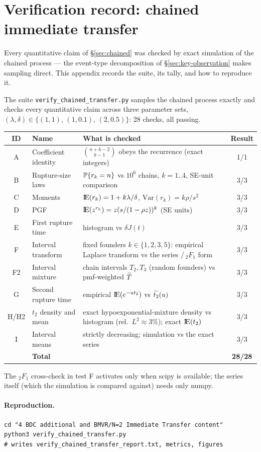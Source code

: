 
\section{Verification record: chained immediate transfer}
\label{app:verification}

Every quantitative claim of \S\ref{sec:chained} was checked by exact
simulation of the chained process --- the event-type decomposition of
\S\ref{sec:key-observation} makes sampling direct. This appendix records the
suite, its tally, and how to reproduce it.

The suite \texttt{verify\_chained\_transfer.py} samples the chained process
exactly and checks every quantitative claim across three parameter sets,
$(\lambda,\delta)\in\{(1,1),\,(1,0.1),\,(2,0.5)\}$: 28 checks, all passing.

\begin{center}
\renewcommand{\arraystretch}{1.2}
\small
\begin{tabular}{@{}clp{}c@{}}
\toprule
ID & Name & What is checked & Result \\
\midrule
A & Coefficient identity &
  $\binom{n+k-2}{k-1}$ obeys the recurrence (exact integers) & 1/1 \\
B & Rupture-size laws &
  $\mathbb{P}\!\left\{r_k=n\right\}$ vs $10^6$ chains, $k=1..4$, SE-unit comparison & 3/3 \\
C & Moments & ${\rm I}\!{\rm E}(r_k)=1+k\lambda/\delta$, $\mathrm{Var}(r_k)=k\rho/s^2$ & 3/3 \\
D & PGF & ${\rm I}\!{\rm E}(z^{r_k})=z(s/(1-\rho z))^k$ (SE units) & 3/3 \\
E & First rupture time & histogram vs $\delta J(t)$ & 3/3 \\
F & Interval transform &
  fixed founders $k\in\{1,2,3,5\}$: empirical Laplace transform vs the
  series $/\,{}_2F_1$ form & 3/3 \\
F2 & Interval mixture &
  chain intervals $T_2,T_3$ (random founders) vs pmf-weighted $\widetilde{T}$ & 3/3 \\
G & Second rupture time & empirical ${\rm I}\!{\rm E}(e^{-ut_2})$ vs $\widetilde{t_2}(u)$ & 3/3 \\
H/H2 & $t_2$ density and mean &
  exact hypoexponential-mixture density vs histogram
  (rel.\ $L^2\approx3\%$); exact ${\rm I}\!{\rm E}(t_2)$ & 3/3 \\
I & Interval means &
  strictly decreasing; simulation vs the exact series & 3/3 \\
\midrule
 & \textbf{Total} & & \textbf{28/28} \\
\bottomrule
\end{tabular}
\end{center}
The ${}_2F_1$ cross-check in test F activates only when scipy is available;
the series itself (which the simulation is compared against) needs only
numpy.

\paragraph{Reproduction.}
\begin{verbatim}
cd "4 BDC additional and BMVR/N=2 Immediate Transfer content"
python3 verify_chained_transfer.py
# writes verify_chained_transfer_report.txt, metrics, figures
\end{verbatim}
